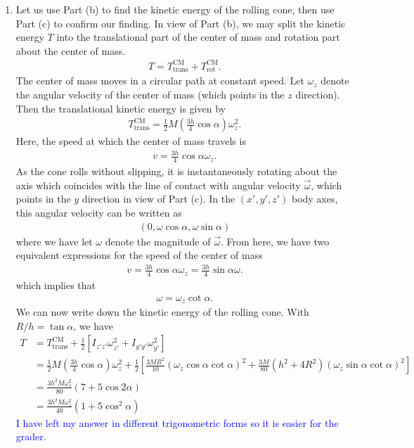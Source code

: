 \documentclass{article}
\theoremstyle{definition}
\newcommand{\al}{\alpha}
\newcommand{\f}[2]{\frac{#1}{#2}}
\newcommand{\lp}{\left(}
\newcommand{\rp}{\right)}
\newcommand{\lb}{\left[}
\newcommand{\rb}{\right]}
\begin{document}
\begin{enumerate}[label=(\alph*)]
	
	
	\item  Let us use Part (b) to find the kinetic energy of the rolling cone, then use Part (c) to confirm our finding. In view of Part (b), we may split the kinetic energy $T$ into the translational part of the center of mass and rotation part about the center of mass.  
	\begin{align*}
	T = T_{\text{trans}}^\text{CM} + T_{\text{rot}}^\text{CM}.
	\end{align*}
	The center of mass moves in a circular path at constant speed. Let $\omega_z$ denote the angular velocity of the center of mass (which points in the $z$ direction). Then the translational kinetic energy is given by 
	\begin{align*}
	T_{\text{trans}}^\text{CM}  = \f{1}{2} M \lp \f{3h}{4}\cos\al \rp \omega_z^2.
	\end{align*}
	Here, the speed at which the center of mass travels is 
	\begin{align*}
	v = \f{3h}{4}\cos\al \omega_z.
	\end{align*}
	As the cone rolls without slipping, it is instantaneously rotating about the axis which coincides with the line of contact with angular velocity $\vec{\omega}$, which points in the $y$ direction in view of Part (c). In the $(x',y',z')$ body axes, this angular velocity can be written as
	\begin{align*}
	(0, \omega \cos\al, \omega \sin\al) 
	\end{align*}
	where we have let $\omega$ denote the magnitude of $\vec{\omega}$. From here, we have two equivalent expressions for the speed of the center of mass
	\begin{align*}
	v = \f{3h}{4}\cos\al \omega_z = \f{3h}{4}\sin\al \omega.
	\end{align*}
	which implies that
	\begin{align*}
	\omega = \omega_z \cot\al.
	\end{align*}
	We can now write down the kinetic energy of the rolling cone. With $R/h = \tan \al$, we have
	\begin{align*}
	T 
	&= T_{\text{trans}}^\text{CM} + \f{1}{2}\lb I_{z'z'}\omega_{z'}^2 + I_{y'y'} \omega_{y'}^2 \rb \\
	&= \f{1}{2} M \lp \f{3h}{4}\cos\al \rp \omega_z^2 + \f{1}{2}\lb \f{3MR^2}{10}\lp \omega_z \cos\al\cot\al  \rp^2 + \f{3M}{80}\lp h^2 + 4R^2 \rp\lp  \omega_z \sin\al \cot\al \rp^2 \rb \\
	&= \boxed{\f{3h^2 M \omega_z^2}{80}\lp 7 + 5\cos 2\al \rp} \\
	&=  \boxed{\f{3h^2 M \omega_z^2}{40}\lp 1+5\cos^2\al \rp}
	\end{align*}
	\textcolor{blue}{I have left my answer in different trigonometric forms so it is easier for the grader.} 
	

\end{enumerate}
\end{document}
